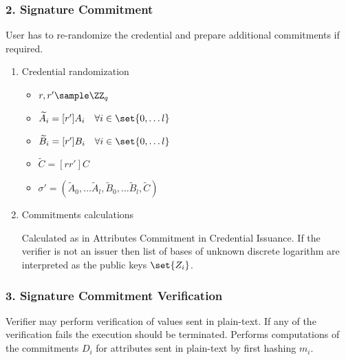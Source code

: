 \subsubsection*{2. Signature Commitment}
User has to re-randomize the credential and prepare additional commitments if required.
\begin{enumerate}
    \item Credential randomization
    
    \begin{itemize}[label={}]
        \item $r, r' \sample \ZZ_q$
        \item $\widetilde A_i = [r']A_i \quad \forall i \in \set{0, \dots l} $
        \item $\widetilde B_i = [r']B_i \quad \forall i \in \set{0, \dots l} $
        \item $\widetilde C = [rr']C $
        \item $\sigma' = (\widetilde A_0, \dots \widetilde A_l, \widetilde B_0, \dots \widetilde B_l, \widetilde C) $
    \end{itemize}
    
    \item Commitments calculations
    
    Calculated as in Attributes Commitment in Credential Issuance. If the verifier is not an issuer then list of \textsf{bases} of unknown discrete logarithm are interpreted as the public keys $\set{Z_i}$.
    
    
\end{enumerate}

\subsubsection*{3. Signature Commitment Verification}

Verifier may perform verification of values sent in plain-text. If any of the verification fails the execution should be terminated. Performs computations of the commitments $D_i$ for attributes sent in plain-text by first hashing $m_i$.

